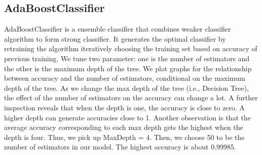 \documentclass[12pt]{article}
\begin{document}

\subsection{AdaBoostClassifier}
AdaBoostClassifier is a ensemble classifier that combines weaker classifier algorithm to form strong classifier. It generates the optimal classifier by retraining the algorithm iteratively choosing the training set based on accuracy of previous training. We tune two parameter: one is the number of estimators and the other is the maximum depth of the tree. We plot graphs for the relationship between accuracy and the number of estimators, conditional on the maximum depth of the tree. As we change the max depth of the tree (i.e., Decision Tree), the effect of the number of estimators on the accuracy can change a lot. A further inspection reveals that when the depth is one, the accuracy is close to zero. A higher depth can generate accuracies close to 1. Another observation is that the average accuracy corresponding to each max depth gets the highest when the depth is four. Thus, we pick up MaxDepth = 4. Then, we choose 50 to be the number of estimators in our model. The highest accuracy is about 0.99985.
\end{document}
